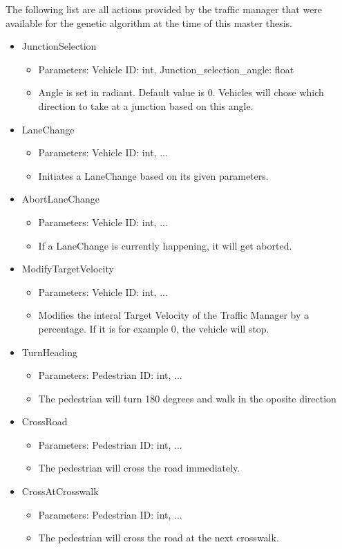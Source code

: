 The following list are all actions provided by the traffic manager that were available for the genetic algorithm at the time of this master thesis.
\begin{itemize}
	\item JunctionSelection
	\begin{itemize}
		\item Parameters: Vehicle ID: int, Junction\_selection\_angle: float
		\item Angle is set in radiant. Default value is 0. Vehicles will chose which direction to take at a junction based on this angle.
	\end{itemize}
	\item LaneChange
	\begin{itemize}
		\item Parameters: Vehicle ID: int, ...
		\item Initiates a LaneChange based on its given parameters.
	\end{itemize}
	\item AbortLaneChange
	\begin{itemize}
		\item Parameters: Vehicle ID: int, ...
		\item If a LaneChange is currently happening, it will get aborted.
	\end{itemize}
	\item ModifyTargetVelocity
	\begin{itemize}
		\item Parameters: Vehicle ID: int, ...
		\item Modifies the interal Target Velocity of the Traffic Manager by a percentage. If it is for example 0, the vehicle will stop.
	\end{itemize}
	\item TurnHeading
	\begin{itemize}
		\item Parameters: Pedestrian ID: int, ...
		\item The pedestrian will turn 180 degrees and walk in the oposite direction
	\end{itemize}
	\item CrossRoad
	\begin{itemize}
		\item Parameters: Pedestrian ID: int, ...
		\item The pedestrian will cross the road immediately.
	\end{itemize}
	\item CrossAtCrosswalk
	\begin{itemize}
		\item Parameters: Pedestrian ID: int, ...
		\item The pedestrian will cross the road at the next crosswalk.
	\end{itemize}
\end{itemize}

